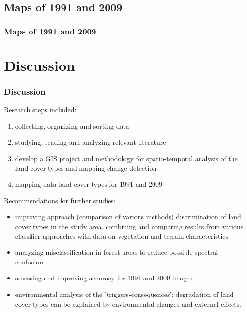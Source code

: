 \documentclass[pdflatex,compress,8pt,
	xcolor={dvipsnames,dvipsnames,svgnames,x11names,table},
	hyperref={
	breaklinks = true, 
	pdfauthor={Lemenkova Polina}, 
	pdfsubject={Preentation}, 
	pdfcreator={Lemenkova Polina}, 
	pdfproducer={Lemenkova Polina}, 
	colorlinks=true,linkcolor=blue, 
	citecolor=NavyBlue, 
	urlcolor = NavyBlue, 
	breaklinks = true}]{beamer}
\begin{document}
\subsection{Maps of 1991 and 2009}
\begin{frame}\frametitle{Maps of 1991 and 2009}
\begin{figure}[H]
	\centering
			\hspace{1mm}
\end{figure}
\end{frame}

\section{Discussion}
\begin{frame}\frametitle{Discussion}
Research steps included:
\begin{enumerate}
	\item collecting, organizing and sorting data
	\item studying, reading and analyzing relevant literature
	\item develop a GIS project and methodology for spatio-temporal analysis of the land cover types and mapping change detection
	\item mapping data land cover types for 1991 and 2009
\end{enumerate}

Recommendations for further studies:
\begin{itemize}
	\item improving approach (comparison of various methods) discrimination of land cover types in the study area, combining and comparing results from various classifier approaches with data on vegetation and terrain characteristics
	\item analyzing misclassification in forest areas to reduce possible spectral confusion
	\item assessing and improving accuracy for 1991 and 2009 images
	\item environmental analysis of the 'triggers-consequences': degradation of land cover types can be explained by environmental changes and external effects.
\end{itemize}
\end{frame}
\end{document}
